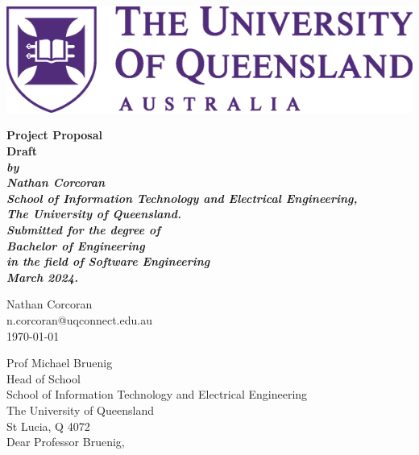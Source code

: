 \documentclass[12pt,openany,a4paper]{book}
\renewcommand{\baselinestretch}{1.2}	%
\begin{document}
\frontmatter

\begin{titlepage}
\begin{center}
\includegraphics[width=\linewidth]{UQLogo.png}
\end{center}
\renewcommand{\baselinestretch}{1.0}
\begin{center}
\vspace*{35mm}
\Huge\bf
        Project Proposal\\
        Draft\\
\vspace{20mm}
\large\sl
		by\\
		Nathan Corcoran
		\medskip\\
\rm
		School of Information Technology and Electrical Engineering,\\
		The University of Queensland.\\
\vspace{30mm}
		Submitted for the degree of\\
		Bachelor of Engineering
		\smallskip\\
\normalsize
		in the field of Software Engineering
		\medskip\\
\large
		March 2024.
\end{center}
\end{titlepage}

\cleardoublepage

\begin{flushright}
    Nathan Corcoran\\
    n.corcoran@uqconnect.edu.au\\
	\medskip
	\today
\end{flushright}
\begin{flushleft}
  Prof Michael Bruenig\\
  Head of School\\
  School of Information Technology and Electrical Engineering\\
  The University of Queensland\\
  St Lucia, Q 4072\\
  \bigskip\bigskip
  Dear Professor Bruenig,
\end{flushleft}
\end{document}
